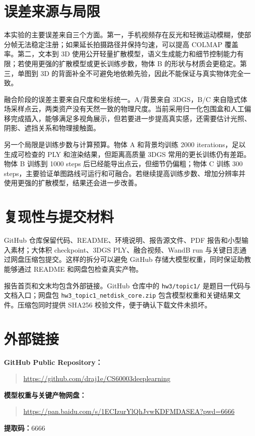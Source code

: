 \documentclass[10pt,twocolumn]{ctexart}
\newcommand{\repo}{\url{https://github.com/draj1e/CS60003deeplearning}}
\newcommand{\cloud}{\url{https://pan.baidu.com/s/1ECIzurYlQhJvwKDFMDASEA?pwd=6666}}
\begin{document}
\section{误差来源与局限}
本实验的主要误差来自三个方面。第一，手机视频存在反光和轻微运动模糊，使部分帧无法稳定注册；如果延长拍摄路径并保持匀速，可以提高 COLMAP 覆盖率。第二，文本到 3D 使用公开轻量扩散模型，语义生成能力和细节控制能力有限；若使用更强的扩散模型或更长训练步数，物体 B 的形状与材质会更稳定。第三，单图到 3D 的背面补全不可避免地依赖先验，因此不能保证与真实物体完全一致。

融合阶段的误差主要来自尺度和坐标统一。A/背景来自 3DGS，B/C 来自隐式体场采样点云，两类资产没有天然一致的物理尺度。当前采用归一化包围盒和人工偏移完成插入，能够满足多视角展示，但若要进一步提高真实感，还需要估计光照、阴影、遮挡关系和物理接触面。

另一个局限是训练步数与计算预算。物体 A 和背景均训练 2000 iterations，足以生成可检查的 PLY 和渲染结果，但距离高质量 3DGS 常用的更长训练仍有差距。物体 B 训练到 1000 steps 后已经能导出点云，但细节仍偏粗；物体 C 训练 300 steps，主要验证单图路线可运行和可融合。若继续提高训练步数、增加分辨率并使用更强的扩散模型，结果还会进一步改善。

\section{复现性与提交材料}
GitHub 仓库保留代码、README、环境说明、报告源文件、PDF 报告和小型输入素材；大体积 checkpoint、3DGS PLY、融合视频、WandB run 与关键日志通过网盘压缩包提交。这样的拆分可以避免 GitHub 存储大模型权重，同时保证助教能够通过 README 和网盘包检查真实产物。

报告首页和文末均包含外部链接。GitHub 仓库中的 \texttt{hw3/topic1/} 是题目一代码与文档入口；网盘包 \texttt{hw3\_topic1\_netdisk\_core.zip} 包含模型权重和关键结果文件。压缩包同时提供 SHA256 校验文件，便于确认下载文件未损坏。

\section{外部链接}
\noindent\textbf{GitHub Public Repository：}
\begin{quote}\small
\repo
\end{quote}

\noindent\textbf{模型权重与关键产物网盘：}
\begin{quote}\small
\cloud
\end{quote}

\noindent\textbf{提取码：}6666
\end{document}
